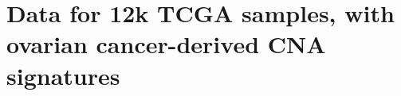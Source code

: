 \documentclass{article}
\begin{document}
\begin{knitrout}
\color{fgcolor}\begin{kframe}
\begin{alltt}
\end{alltt}
\end{kframe}
\end{knitrout}


\section{Data for 12k TCGA samples, with ovarian cancer-derived CNA signatures}
\end{document}
